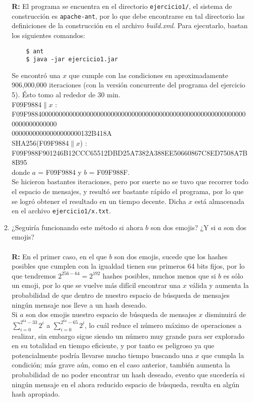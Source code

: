 \documentclass[14pt]{article}
\begin{document}
\begin{enumerate}[label=\alph*)]
  \textbf{R:} El programa se encuentra en el directorio \texttt{ejercicio1/}, el sistema de construcción es \texttt{apache-ant}, por lo que debe encontrarse en tal directorio las definiciones de la construcción en el archivo \textit{build.xml}.
  Para ejecutarlo, bastan los siguientes comandos:
\begin{verbatim}
    $ ant
    $ java -jar ejercicio1.jar
\end{verbatim}
  Se encontró una $x$ que cumple con las condiciones en aproximadamente 906,000,000 iteraciones (con la versión concurrente del programa del ejercicio 5). Ésto tomo al rededor de 30 min. \\
  
  F09F9884$ \parallel x$ :  F09F9884000000000000000000000000000000000000000000000000000000000000000000000000\\00000000000000000000132B418A \\
  
  SHA256(F09F9884$\parallel x$) : F09F988F901246B12CCC65512DBD25A7382A388EE50660867C8ED7508A7B8B95 \\
  
donde $a$ = F09F9884 y $b$ = F09F988F. \\

Se hicieron bastantes iteraciones, pero por suerte no se tuvo que recorrer todo el espacio de mensajes, y resultó ser bastante rápido el programa, por lo que se logró obtener el resultado en un tiempo decente. Dicha $x$ está almacenada en el archivo \texttt{ejercicio1/x.txt}. 
  
\item ¿Seguiría funcionando este método si ahora $b$ son dos emojis? ¿Y si $a$ son dos emojis? \\ \\
  \textbf{R:} En el primer caso, en el que $b$ son dos emojis, sucede que los hashes posibles que cumplen con la igualdad tienen sus primeros 64 bits fijos, por lo que tendremos $2^{256 - 64} = 2 ^ {192}$ hashes posibles, muchos menos que si $b$ es sólo un emoji, por lo que se vuelve más difícil encontrar una $x$ válida y aumenta la probabilidad de que dentro de nuestro espacio de búsqueda de mensajes ningún mensaje nos lleve a un hash deseado. \\

Si $a$ son dos emojis nuestro espacio de búsqueda de mensajes $x$ disminuirá de $\sum_{i = 0}^{2^{64} - 33}2^i$ a $\sum_{i = 0}^{2^{64} - 65}2^i$, lo cuál reduce el número máximo de operaciones a realizar, sin embargo sigue siendo un número muy grande para ser explorado en su totalidad en tiempo eficiente, y por tanto es peligroso ya que potencialmente podría llevarse mucho tiempo buscando una $x$ que cumpla la condición; más grave aún, como en el caso anterior, también aumenta la probabilidad de no poder encontrar un hash deseado, evento que sucedería si ningún mensaje en el ahora reducido espacio de búsqueda, resulta en algún hash apropiado.

\end{enumerate}
\end{document}
